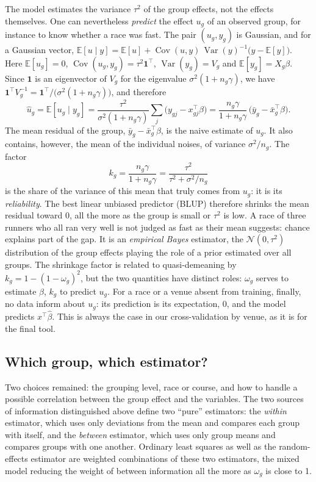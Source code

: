 \documentclass[11pt,a4paper]{article}
\newcommand{\E}{\mathbb{E}}
\DeclareMathOperator{\Var}{Var}
\DeclareMathOperator{\Cov}{Cov}
\begin{document}
The model estimates the variance $\tau^2$ of the group effects, not the effects themselves. One can nevertheless
\emph{predict} the effect $u_g$ of an observed group, for instance to know whether a race was fast. The pair
$(u_g, y_g)$ is Gaussian, and for a Gaussian vector,
$\E[u \mid y] = \E[u] + \Cov(u, y)\,\Var(y)^{-1}\big(y - \E[y]\big)$. Here $\E[u_g] = 0$,
$\Cov(u_g, y_g) = \tau^2\mathbf 1^\top$, $\Var(y_g) = V_g$ and $\E[y_g] = X_g\beta$. Since $\mathbf 1$ is an eigenvector
of $V_g$ for the eigenvalue $\sigma^2(1 + n_g\gamma)$, we have
$\mathbf 1^\top V_g^{-1} = \mathbf 1^\top/\big(\sigma^2(1 + n_g\gamma)\big)$, and therefore
\begin{equation}\label{eq:blup}
\hat u_g = \E[u_g \mid y_g] = \frac{\tau^2}{\sigma^2(1 + n_g\gamma)}\sum_j\big(y_{gj} - x_{gj}^\top\beta\big)
= \frac{n_g\gamma}{1 + n_g\gamma}\,\big(\bar y_g - \bar x_g^\top\beta\big) .
\end{equation}
The mean residual of the group, $\bar y_g - \bar x_g^\top\beta$, is the naive estimate of $u_g$. It also contains,
however, the mean of the individual noises, of variance $\sigma^2/n_g$. The factor
\[
k_g = \frac{n_g\gamma}{1 + n_g\gamma} = \frac{\tau^2}{\tau^2 + \sigma^2/n_g}
\]
is the share of the variance of this mean that truly comes from $u_g$: it is its \emph{reliability}. The best linear
unbiased predictor (BLUP) therefore shrinks the mean residual toward 0, all the more as the group is small or $\tau^2$
is low. A race of three runners who all ran very well is not judged as fast as their mean suggests: chance explains
part of the gap. It is an \emph{empirical Bayes} estimator, the $\mathcal N(0, \tau^2)$ distribution of the group
effects playing the role of a prior estimated over all groups. The shrinkage factor is related to quasi-demeaning by
$k_g = 1 - (1 - \omega_g)^2$, but the two quantities have distinct roles: $\omega_g$ serves to estimate $\beta$, $k_g$
to predict $u_g$. For a race or a venue absent from training, finally, no data inform about $u_g$: its prediction is
its expectation, 0, and the model predicts $x^\top\hat\beta$. This is always the case in our cross-validation by venue,
as it is for the final tool.

\subsection{Which group, which estimator?}\label{sec:which_estimator}

Two choices remained: the grouping level, race or course, and how to handle a possible correlation between the group
effect and the variables. The two sources of information distinguished above define two ``pure'' estimators: the
\emph{within} estimator, which uses only deviations from the mean and compares each group with itself, and the
\emph{between} estimator, which uses only group means and compares groups with one another. Ordinary least squares as
well as the random-effects estimator are weighted combinations of these two estimators, the mixed model reducing the
weight of between information all the more as $\omega_g$ is close to 1.
\end{document}

